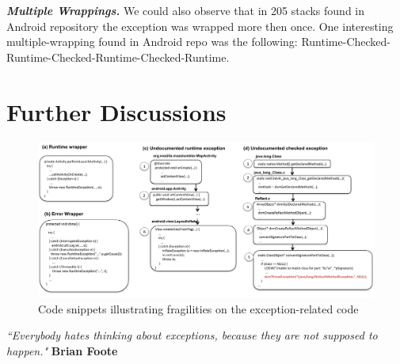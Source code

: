 \documentclass[conference]{IEEEtran}
\begin{document}


\emph{\textbf{Multiple Wrappings.}} We could also observe that in 205 stacks found
 in Android repository the exception was wrapped  more then once. One interesting 
multiple-wrapping found in Android repo was the 
following: Runtime-Checked-Runtime-Checked-Runtime-Checked-Runtime.

\noindent {}


\section{Further Discussions}
\label{sec:disc}

\begin{figure} \centering \includegraphics[scale=0.55]{codeexamples.pdf}
\caption{Code snippets illustrating fragilities on the exception-related code} \label{fig:snippets} \end{figure}


\emph{``Everybody hates thinking about exceptions, because they are not supposed to happen."}
\textbf{Brian Foote} 
\end{document}
